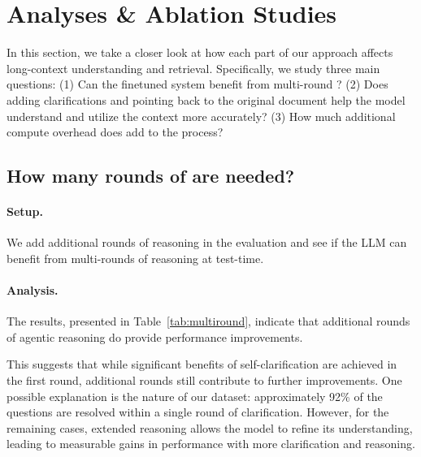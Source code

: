 \section{Analyses \& Ablation Studies}
\label{sec:analysis}
In this section, we take a closer look at how each part of our approach affects long-context understanding and retrieval. Specifically, we study three main questions: (1) Can the finetuned system benefit from multi-round \coc? (2) Does adding clarifications and pointing back to the original document help the model understand and utilize the context more accurately? (3) How much additional compute overhead does \method add to the process?


\subsection{How many rounds of \coc are needed?}
\paragraph{Setup.}
We add additional rounds of reasoning in the evaluation and see if the LLM can benefit from multi-rounds of reasoning at test-time.

\paragraph{Analysis.}
The results, presented in Table~\ref{tab:multiround}, indicate that additional rounds of agentic reasoning do provide performance improvements. 

This suggests that while significant benefits of self-clarification are achieved in the first round, additional rounds still contribute to further improvements. 
One possible explanation is the nature of our dataset: approximately 92\% of the questions are resolved within a single round of clarification. However, for the remaining cases, extended reasoning allows the model to refine its understanding, leading to measurable gains in performance with more clarification and reasoning.



